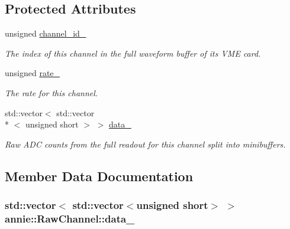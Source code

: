 \subsection*{Protected Attributes}
\begin{DoxyCompactItemize}
\item 
\hypertarget{classannie_1_1RawChannel_ad169e3385ece998437d8cf01000efcba}{unsigned \hyperlink{classannie_1_1RawChannel_ad169e3385ece998437d8cf01000efcba}{channel\-\_\-id\-\_\-}}\label{classannie_1_1RawChannel_ad169e3385ece998437d8cf01000efcba}

\begin{DoxyCompactList}\small\item\em The index of this channel in the full waveform buffer of its V\-M\-E card. \end{DoxyCompactList}\item 
\hypertarget{classannie_1_1RawChannel_aea856777ad9bdf78603c717df2e8b620}{unsigned \hyperlink{classannie_1_1RawChannel_aea856777ad9bdf78603c717df2e8b620}{rate\-\_\-}}\label{classannie_1_1RawChannel_aea856777ad9bdf78603c717df2e8b620}

\begin{DoxyCompactList}\small\item\em The rate for this channel. \end{DoxyCompactList}\item 
std\-::vector$<$ std\-::vector\\*
$<$ unsigned short $>$ $>$ \hyperlink{classannie_1_1RawChannel_a56cecbafdc1dfcce9c8a3a4d90b528a1}{data\-\_\-}
\begin{DoxyCompactList}\small\item\em Raw A\-D\-C counts from the full readout for this channel split into minibuffers. \end{DoxyCompactList}\end{DoxyCompactItemize}


\subsection{Member Data Documentation}
\hypertarget{classannie_1_1RawChannel_a56cecbafdc1dfcce9c8a3a4d90b528a1}{
\subsubsection[{data\-\_\-}]{\setlength{\rightskip}{0pt plus 5cm}std\-::vector$<$ std\-::vector$<$unsigned short$>$ $>$ annie\-::\-Raw\-Channel\-::data\-\_\-\hspace{0.3cm}{\ttfamily [protected]}}}\label{classannie_1_1RawChannel_a56cecbafdc1dfcce9c8a3a4d90b528a1}


